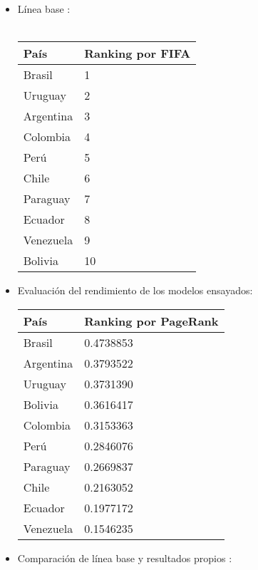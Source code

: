 \documentclass[twocolumn]{article}
\begin{document}
\begin{itemize}
	\item
Línea base :\\ \\
    \begin{tabular}{|l|l|}
	\hline
País & Ranking por FIFA \\
\hline \hline
Brasil & 1\\ \hline
Uruguay & 2 \\ \hline
Argentina & 3 \\ \hline
Colombia & 4 \\ \hline
Perú & 5 \\ \hline
Chile & 6 \\ \hline
Paraguay & 7 \\ \hline
Ecuador & 8 \\ \hline
Venezuela & 9 \\ \hline
Bolivia & 10 \\ \hline
\end{tabular}
	\item
Evaluación del rendimiento de los modelos ensayados: \\

	\begin{tabular}{|l|l|}
	\hline
País & Ranking por PageRank\\
\hline \hline
Brasil & 0.4738853 \\ \hline
Argentina & 0.3793522 \\ \hline
Uruguay & 0.3731390\\ \hline
Bolivia & 0.3616417 \\ \hline
Colombia & 0.3153363 \\ \hline
Perú & 0.2846076 \\ \hline
Paraguay & 0.2669837 \\ \hline
Chile & 0.2163052 \\ \hline
Ecuador & 0.1977172 \\ \hline
Venezuela & 0.1546235 \\ \hline
\end{tabular}
    \item
    Comparación de línea base y resultados propios : 
	\end{itemize}	


\end{document}
